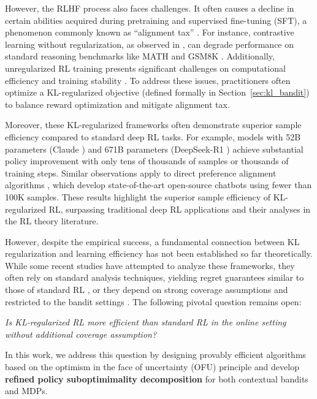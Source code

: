 \documentclass[11pt]{article}
\begin{document}
However, the RLHF process also faces challenges. It often causes a decline in certain abilities acquired during pretraining and supervised fine-tuning (SFT), a phenomenon commonly known as “alignment tax” \citep{askell2021general, lin2023speciality}. For instance, contrastive learning without regularization, as observed in \citet{meng2024simpo}, can degrade performance on standard reasoning benchmarks like MATH \citep{hendrycks2021measuring} and GSM8K \citep{cobbe2021training}. Additionally, unregularized RL training presents significant challenges on computational efficiency and training stability \citep{casper2023open}. To address these issues, practitioners often optimize a KL-regularized objective (defined formally in Section~\ref{sec:kl_bandit}) to balance reward optimization and mitigate alignment tax.

Moreover, these KL-regularized frameworks often demonstrate superior sample efficiency compared to standard deep RL tasks. For example, models with 52B parameters (Claude \citep{bai2022training}) and 671B parameters (DeepSeek-R1 \citep{deepseekai2025deepseekr1incentivizingreasoningcapability}) achieve substantial policy improvement with only tens of thousands of samples or thousands of training steps. Similar observations apply to direct preference alignment algorithms \citep{rafailov2023direct, tunstall2023zephyr, chen2024self, dong2024rlhf}, which develop state-of-the-art open-source chatbots using fewer than 100K samples. These results highlight the superior sample efficiency of KL-regularized RL, surpassing traditional deep RL applications \citep{silver2016mastering} and their analyses in the RL theory literature.

However, despite the empirical success, a fundamental connection between KL regularization and learning efficiency has not been established so far theoretically. While some recent studies have attempted to analyze these frameworks, they often rely on standard analysis techniques, yielding regret guarantees similar to those of standard RL \citep{xiong2024iterative, xie2024exploratory, xiong2024building, cen2024value}, or they depend on strong coverage assumptions and restricted to the bandit settings \citep{zhao2024sharp}. The following pivotal question remains open:
\begin{center}
    \textit{Is KL-regularized RL more efficient than standard RL in the online setting without additional coverage assumption?}
\end{center}
In this work, we address this question by designing provably efficient algorithms based on the optimism in the face of uncertainty (OFU) principle and develop \textbf{refined policy suboptimimality decomposition} for both contextual bandits and MDPs.
\end{document}
